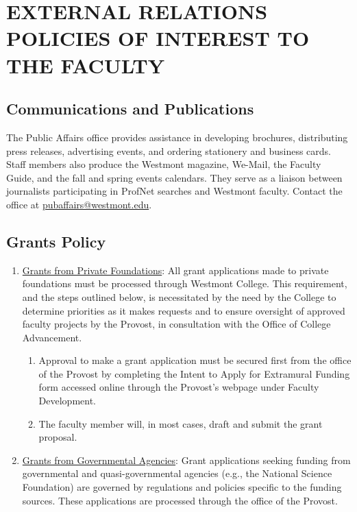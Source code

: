 \section{EXTERNAL RELATIONS POLICIES OF INTEREST TO THE FACULTY}
	\subsection{Communications and Publications}
		The Public Affairs office provides assistance in developing brochures,
		distributing press releases, advertising events, and ordering stationery
		and business cards. Staff members also produce the Westmont magazine,
		We-Mail, the Faculty Guide, and the fall and spring events calendars.
		They serve as a liaison between journalists participating in ProfNet
		searches and Westmont faculty. Contact the office at
		\underline{pubaffairs@westmont.edu}.
	\subsection{Grants Policy}
		\begin{enumerate}[label=\alph*)]
			\item{\underline{Grants from Private
					Foundations}:  All grant applications made to private foundations must be processed through Westmont College.  This requirement, and the steps outlined below, is necessitated by the need by the College to determine priorities as it makes requests and to ensure oversight of approved faculty projects by the Provost, in consultation with the Office of College Advancement.
				\begin{enumerate}[label=\alph*)]
					\item{Approval to make a grant application
						must be secured first from
						the office of the Provost by
						completing the Intent to
						Apply for Extramural Funding
						form accessed online through
						the Provost's webpage under
						Faculty Development.}
					\item{The faculty member will, in most
						cases, draft and submit the
						grant proposal.}
				\end{enumerate}
			}
			\item{\underline{Grants from Governmental Agencies}:  Grant applications seeking funding from governmental and quasi-governmental agencies (e.g., the National Science Foundation) are governed by regulations and policies specific to the funding sources. These applications are processed through the office of the Provost.
			}
		\end{enumerate}
